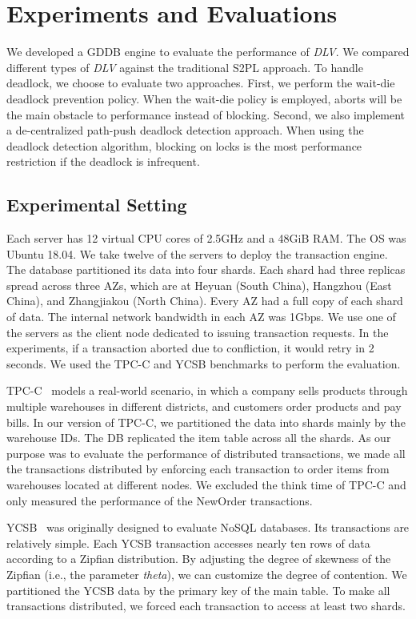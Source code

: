 \documentclass[conference]{IEEEtran}
\begin{document}
\section{Experiments and Evaluations}
\label{sec:experiment}
We developed a GDDB engine to evaluate the performance of \emph{DLV}.
We compared different types of \emph{DLV} against the traditional S2PL approach. 
To handle deadlock, we choose to evaluate two approaches.
First,  we perform the wait-die deadlock prevention policy.
When the wait-die policy is employed, aborts will be the main obstacle to performance instead of blocking. 
Second, we also implement a de-centralized path-push deadlock detection approach.
When using the deadlock detection algorithm,  blocking on locks is the most performance restriction if the deadlock is infrequent.

\subsection{Experimental Setting}
\label{subsec:exp_setting}
Each server has 12 virtual CPU cores of 2.5GHz and a 48GiB RAM. 
The OS was Ubuntu 18.04.
We take twelve of the servers to deploy the transaction engine.
The database partitioned its data into four shards. 
Each shard had three replicas spread across three AZs, 
which are at Heyuan (South China), Hangzhou (East China), and Zhangjiakou (North China).
Every AZ had a full copy of each shard of data.
The internal network bandwidth in each AZ was 1Gbps.
We use one of the servers as the client node dedicated to issuing transaction requests. 
In the experiments, if a transaction aborted due to confliction, it would retry in 2 seconds.
We used the TPC-C and YCSB benchmarks to perform the evaluation. 


TPC-C~\cite{TPCC:conf/tpctc/NambiarWMTLCM11} models a real-world scenario, in which a company sells products through multiple warehouses in different districts, and customers order products and pay bills.
In our version of TPC-C, we partitioned the data into shards mainly by the warehouse IDs.
The DB replicated the item table across all the shards.
As our purpose was to evaluate the performance of distributed transactions,
we made all the transactions distributed by enforcing each transaction to order items from warehouses located at different nodes.
We excluded the think time of TPC-C and only measured the performance of the NewOrder transactions.


YCSB~\cite{YCSB:conf/cloud/CooperSTRS10} was originally designed to evaluate NoSQL databases.
Its transactions are relatively simple.
Each YCSB transaction accesses nearly ten rows of data according to a Zipfian distribution.
By adjusting the degree of skewness of the Zipfian (i.e., the parameter \emph{theta}), we can customize the degree of contention.
We partitioned the YCSB data by the primary key of the main table.
To make all transactions distributed, we forced each transaction to access at least two shards.
\end{document}

